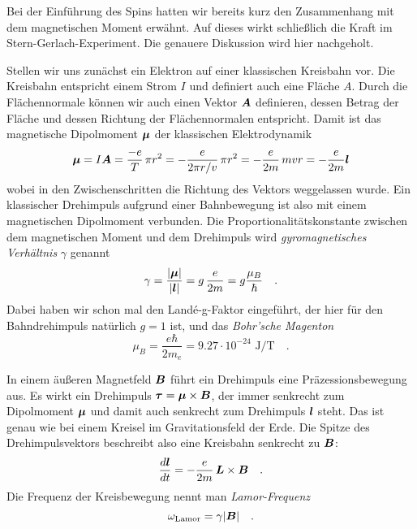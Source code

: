 Bei der Einführung des Spins hatten wir bereits kurz den Zusammenhang mit dem magnetischen Moment erwähnt. Auf dieses wirkt schließlich die Kraft im Stern-Gerlach-Experiment. Die genauere Diskussion wird hier nachgeholt.

Stellen wir uns zunächst ein Elektron auf einer klassischen Kreisbahn vor. Die Kreisbahn entspricht einem Strom $I$ und definiert auch eine Fläche $A$. Durch die Flächennormale können wir auch einen Vektor $\boldsymbol{A}$ definieren, dessen Betrag der Fläche und dessen Richtung der Flächennormalen entspricht. Damit ist das magnetische Dipolmoment $\boldsymbol{\mu}$ der klassischen Elektrodynamik 
\begin{equation}
    \boldsymbol{\mu} = I \boldsymbol{A} = \frac{-e}{T} \, \pi r^2 = - \frac{e}{2\pi r/v} \, \pi r^2 
= -\frac{e}{2m} \, m v r = - \frac{e}{2m} \boldsymbol{l}
\end{equation}
wobei in den Zwischenschritten die Richtung des Vektors weggelassen wurde. Ein klassischer Drehimpuls aufgrund einer Bahnbewegung ist also mit einem magnetischen Dipolmoment verbunden. Die Proportionalitätskonstante zwischen dem magnetischen Moment und dem Drehimpuls wird \emph{gyromagnetisches Verhältnis} $\gamma$ genannt
\begin{equation}
    \gamma  = \frac{|\boldsymbol{\mu}|}{|\boldsymbol{l}|} = g \, \frac{e}{2m} = g \frac{\mu_B}{\hbar} \quad .
\end{equation}
Dabei haben wir schon mal den Landé-g-Faktor eingeführt, der hier für den Bahndrehimpuls natürlich $g=1$ ist, und das \emph{Bohr'sche Magenton} 
\begin{equation}
\mu_B = \frac{e \hbar}{2 m_e} = 9.27 \cdot 10^{-24} \text{ J/T}     \quad .
\end{equation}



In einem äußeren Magnetfeld $\boldsymbol{B}$ führt ein Drehimpuls eine Präzessionsbewegung aus. Es wirkt ein Drehimpuls $\boldsymbol{\tau} = \boldsymbol{\mu} \times \boldsymbol{B}$, der immer senkrecht zum Dipolmoment $\boldsymbol{\mu}$ und damit auch senkrecht zum Drehimpuls $\boldsymbol{l}$ steht. Das ist genau wie bei einem Kreisel im Gravitationsfeld der Erde. Die Spitze des Drehimpulsvektors beschreibt also eine Kreisbahn senkrecht zu $\boldsymbol{B}$:
\begin{equation}
    \frac{d \boldsymbol{l}}{dt} = - \frac{e}{2m} \, \boldsymbol{L} \times \boldsymbol{B}  \quad .
\end{equation}
Die Frequenz der Kreisbewegung nennt man \emph{Lamor-Frequenz}
\begin{equation}
    \omega_\text{Lamor} = \gamma | \boldsymbol{B} |  \quad .
\end{equation}


